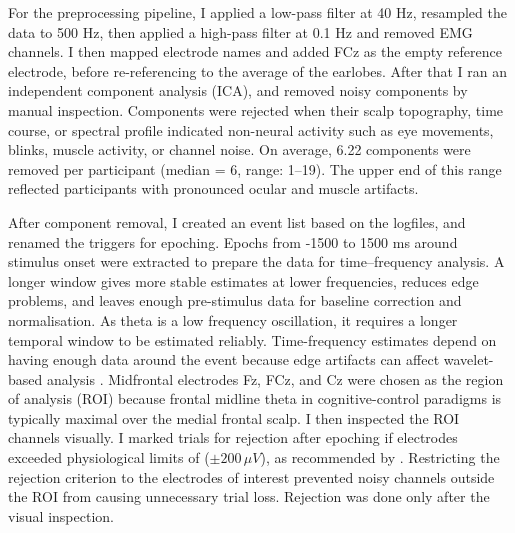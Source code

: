 \documentclass[12pt,a4paper]{report}
\begin{document}
For the preprocessing pipeline, I applied a low-pass filter at 40 Hz, resampled the data to 500 Hz, then applied a high-pass filter at 0.1 Hz and removed EMG channels. I then mapped electrode names and added FCz as the empty reference electrode, before re-referencing to the average of the earlobes. After that I ran an independent component analysis (ICA), and removed noisy components by manual inspection. Components were rejected when their scalp topography, time course, or spectral profile indicated non-neural activity such as eye movements, blinks, muscle activity, or channel noise. On average, 6.22 components were removed per participant (median = 6, range: 1--19). The upper end of this range reflected participants with pronounced ocular and muscle artifacts.

After component removal, I created an event list based on the logfiles, and renamed the triggers for epoching. Epochs from -1500 to 1500 ms around stimulus onset were extracted to prepare the data for time–frequency analysis. A longer window gives more stable estimates at lower frequencies, reduces edge problems, and leaves enough pre-stimulus data for baseline correction and normalisation. As theta is a low frequency oscillation, it requires a longer temporal window to be estimated reliably. Time-frequency estimates depend on having enough data around the event because edge artifacts can affect wavelet-based analysis \parencite{herrmann2014timefrequencytutorial}. Midfrontal electrodes Fz, FCz, and Cz were chosen as the region of analysis (ROI) because frontal midline theta in cognitive-control paradigms is typically maximal over the medial frontal scalp. I then inspected the ROI channels visually. I marked trials for rejection after epoching if electrodes exceeded physiological limits of ($\pm 200\,\mu V$), as recommended by \textcite{luck2014erp}. Restricting the rejection criterion to the electrodes of interest prevented noisy channels outside the ROI from causing unnecessary trial loss. Rejection was done only after the visual inspection.
\end{document}
